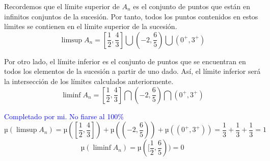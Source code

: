 \begin{problem}
Recordemos que el límite superior de $A_n$ es el conjunto de puntos que están en infinitos conjuntos de la sucesión. Por tanto, todos los puntos contenidos en estos límites se contienen en el límite superior de la sucesión.
\[\limsup A_n = [\frac{1}{2}, \frac{4}{3}] \bigcup  (-2, \frac{6}{5}) \bigcup (0^+, 3^+)\]

Por otro lado, el límite inferior es el conjunto de puntos que se encuentran en todos los elementos de la sucesión a partir de uno dado. Así, el límite inferior será la intersección de los límites calculados anteriormente.
\[\liminf A_n = [\frac{1}{2}, \frac{4}{3}] \bigcap  (-2, \frac{6}{5}) \bigcap (0^+, 3^+)\]

\textcolor{blue}{Completado por mi. No fiarse al 100\%}
\[µ(\limsup A_n) = µ([\frac{1}{2}, \frac{4}{3}]) +  µ((-2, \frac{6}{5})) +µ((0^+, 3^+)) = \frac{1}{3}  + \frac{1}{3} + \frac{1}{3} = 1\]
\[µ(\liminf A_n) = µ([\frac{1}{2}, \frac{6}{5})) = 0\]

\end{problem}

